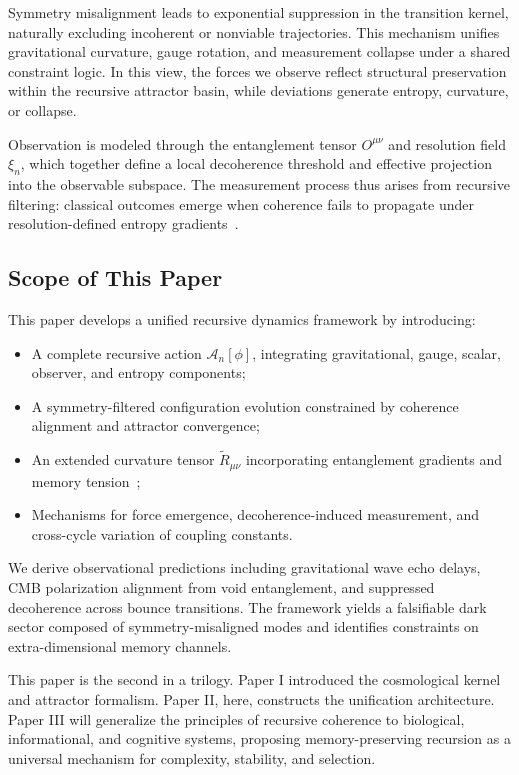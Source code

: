 Symmetry misalignment leads to exponential suppression in the transition kernel, naturally excluding incoherent or nonviable trajectories. This mechanism unifies gravitational curvature, gauge rotation, and measurement collapse under a shared constraint logic. In this view, the forces we observe reflect structural preservation within the recursive attractor basin, while deviations generate entropy, curvature, or collapse.

Observation is modeled through the entanglement tensor \( O^{\mu\nu} \) and resolution field \( \xi_n \), which together define a local decoherence threshold and effective projection into the observable subspace. The measurement process thus arises from recursive filtering: classical outcomes emerge when coherence fails to propagate under resolution-defined entropy gradients~\cite{zurek2003decoherence, nielsen2010quantum}.

\subsection{Scope of This Paper}

This paper develops a unified recursive dynamics framework by introducing:

\begin{itemize}
    \item A complete recursive action \( \mathcal{A}_n[\phi] \), integrating gravitational, gauge, scalar, observer, and entropy components;
    \item A symmetry-filtered configuration evolution constrained by coherence alignment and attractor convergence;
    \item An extended curvature tensor \( \widetilde{R}_{\mu\nu} \) incorporating entanglement gradients and memory tension~\cite{verlinde2011emergent};
    \item Mechanisms for force emergence, decoherence-induced measurement, and cross-cycle variation of coupling constants.
\end{itemize}

We derive observational predictions including gravitational wave echo delays, CMB polarization alignment from void entanglement, and suppressed decoherence across bounce transitions. The framework yields a falsifiable dark sector composed of symmetry-misaligned modes and identifies constraints on extra-dimensional memory channels.

This paper is the second in a trilogy. Paper I introduced the cosmological kernel and attractor formalism. Paper II, here, constructs the unification architecture. Paper III will generalize the principles of recursive coherence to biological, informational, and cognitive systems, proposing memory-preserving recursion as a universal mechanism for complexity, stability, and selection.

